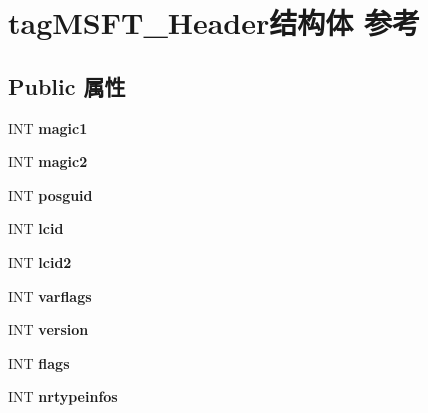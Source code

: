 \hypertarget{structtag_m_s_f_t___header}{}\section{tag\+M\+S\+F\+T\+\_\+\+Header结构体 参考}
\label{structtag_m_s_f_t___header}
\subsection*{Public 属性}
\begin{DoxyCompactItemize}
\item 
\mbox{\label{structtag_m_s_f_t___header_acb1fc83895e633c302eedb58b506d7b2}} 
I\+NT {\bfseries magic1}
\item 
\mbox{\label{structtag_m_s_f_t___header_a300c0d862902bac7be1bd94f95f528af}} 
I\+NT {\bfseries magic2}
\item 
\mbox{\label{structtag_m_s_f_t___header_aaa9d429de5a3a161fa22d23c13199e2c}} 
I\+NT {\bfseries posguid}
\item 
\mbox{\label{structtag_m_s_f_t___header_a365c9b721787db5cbe40a6fdef524811}} 
I\+NT {\bfseries lcid}
\item 
\mbox{\label{structtag_m_s_f_t___header_aac0a8bc6417138dbc8eed639d50f5480}} 
I\+NT {\bfseries lcid2}
\item 
\mbox{\label{structtag_m_s_f_t___header_a282eafa34a784f8383dfd3cfbb558fb9}} 
I\+NT {\bfseries varflags}
\item 
\mbox{\label{structtag_m_s_f_t___header_a2b9d41cc54f7a85df9bc5235a5481f6b}} 
I\+NT {\bfseries version}
\item 
\mbox{\label{structtag_m_s_f_t___header_a0184cabbfebc8e88720f34ecc27111aa}} 
I\+NT {\bfseries flags}
\item 
\mbox{\label{structtag_m_s_f_t___header_aa89ccdc929bd00c01ca12ead9c07317e}} 
I\+NT {\bfseries nrtypeinfos}

\end{DoxyCompactItemize}
